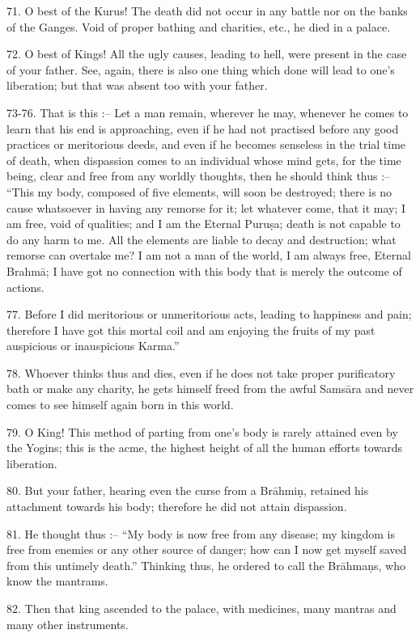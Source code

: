 71. O best of the Kurus! The death did not occur in any battle nor on the banks of the Ganges. Void of proper bathing and charities, etc., he died in a palace.

72. O best of Kings! All the ugly causes, leading to hell, were present in the case of your father. See, again, there is also one thing which done will lead to one's liberation; but that was absent too with your father.

73-76. That is this :-- Let a man remain, wherever he may, whenever he comes to learn that his end is approaching, even if he had not practised before any good practices or meritorious deeds, and even if he becomes senseless in the trial time of death, when dispassion comes to an individual whose mind gets, for the time being, clear and free from any worldly thoughts, then he should think thus :-- ``This my body, composed of five elements, will soon be destroyed; there is no cause whatsoever in having any remorse for it; let whatever come, that it may; I am free, void of qualities; and I am the Eternal Puru\d{s}a; death is not capable to do any harm to me. All the elements are liable to decay and destruction; what remorse can overtake me? I am not a man of the world, I am always free, Eternal Brahm\=a; I have got no connection with this body that is merely the outcome of actions.

77. Before I did meritorious or unmeritorious acts, leading to happiness and pain; therefore I have got this mortal coil and am enjoying the fruits of my past auspicious or inauspicious Karma.''

78. Whoever thinks thus and dies, even if he does not take proper purificatory bath or make any charity, he gets himself freed from the awful Sams\=ara and never comes to see himself again born in this world.

79. O King! This method of parting from one's body is rarely attained even by the Yogins; this is the acme, the highest height of all the human efforts towards liberation.

80. But your father, hearing even the curse from a Br\=ahmi\d{n}, retained his attachment towards his body; therefore he did not attain dispassion.

81. He thought thus :-- ``My body is now free from any disease; my kingdom is free from enemies or any other source of danger; how can I now get myself saved from this untimely death.'' Thinking thus, he ordered to call the Br\=ahma\d{n}s, who know the mantrams.

82. Then that king ascended to the palace, with medicines, many mantras and many other instruments.

